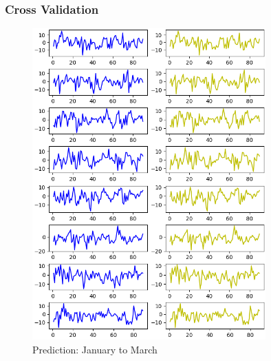 \documentclass[12pt]{article}
\begin{document}
\subsubsection{Cross Validation}

\begin{figure}[htpb]
	\centering
	\includegraphics[width=0.8\textwidth]{pic/Predicted-and-Tested_1.png}
	\caption{Prediction: January to March}
	\label{Fig:pred-1}
\end{figure}
\end{document}
